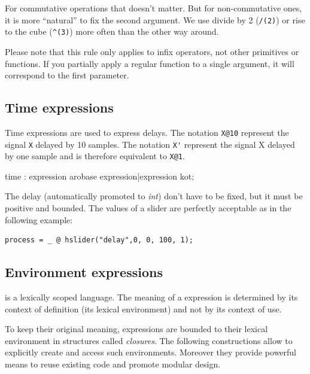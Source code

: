 For commutative operations that doesn't matter. But for non-commutative ones, it is more ``natural'' to fix the second argument.  We use divide by 2 (\lstinline'/(2)') or rise to the cube (\lstinline'^(3)') more often than the other way around.

Please note that this rule only applies to infix operators, not other primitives or functions. If you partially apply a regular function to a single argument, it will correspond to the first parameter.

\subsection{Time expressions}

Time expressions are used to express delays. The notation \lstinline'X@10' represent the signal \lstinline'X' delayed by 10 samples. The notation \lstinline"X'" represent the signal X delayed by one sample and is therefore equivalent to \lstinline'X@1'.

\begin{rail}
time : expression arobase expression|expression kot; 
\end{rail}

The delay (automatically promoted to \textit{int}) don't have to be fixed, but it must be positive and bounded. The values of a slider are perfectly acceptable as in the following example:

\begin{lstlisting}
process = _ @ hslider("delay",0, 0, 100, 1);
\end{lstlisting}

\subsection{Environment expressions}
\faust is a lexically scoped language. The meaning of a \faust expression is determined by its context of definition (its lexical environment) and not by its context of use. 

To keep their original meaning, \faust expressions are bounded to their lexical environment in structures called \textit{closures}. The following constructions allow to explicitly create and access such environments. Moreover they provide powerful means to reuse existing code and promote modular design.


